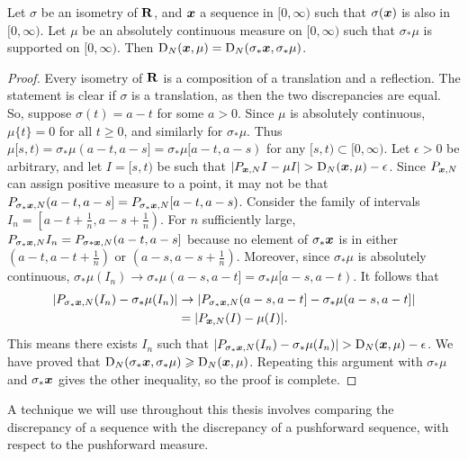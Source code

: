 \begin{lemma}\label{lem:flip-discrepancy}
Let $\sigma$ be an isometry of $\mathbf{R}$, and ${\boldsymbol x}$ a sequence in $[0,\infty)$ 
such that $\sigma({\boldsymbol x})$ is also in $[0,\infty)$. Let $\mu$ be an absolutely 
continuous measure on $[0,\infty)$ such that $\sigma_\ast \mu$ is supported on 
$[0,\infty)$. Then $\operatorname{D}_N({\boldsymbol x}, \mu) = \operatorname{D}_N(\sigma_\ast {\boldsymbol x}, \sigma_\ast \mu)$. 
\end{lemma}
\begin{proof}
Every isometry of $\mathbf{R}$ is a composition of a translation and a reflection. 
The statement is clear if $\sigma$ is a translation, as then the two 
discrepancies are equal. So, suppose $\sigma(t) = a - t$ for some $a>0$. Since 
$\mu$ is absolutely continuous, $\mu\{t\}=0$ for all $t\geqslant 0$, and 
similarly for $\sigma_\ast\mu$. Thus 
$\mu[s,t) = \sigma_\ast\mu(a-t,a-s] = \sigma_\ast\mu[a-t,a-s)$ for any 
$[s,t)\subset [0,\infty)$. Let $\epsilon>0$ be arbitrary, and let 
$I = [s,t)$ be such that $|P_{{\boldsymbol x},N}I - \mu I| > \operatorname{D}_N({\boldsymbol x},\mu) - \epsilon$. 
Since $P_{{\boldsymbol x},N}$ can assign positive measure to a point, it may not be that 
$P_{\sigma_\ast {\boldsymbol x},N}(a-t,a-s] = P_{\sigma_\ast {\boldsymbol x},N}[a-t,a-s)$. Consider the 
family of intervals $I_n = \left[a-t+\frac 1 n, a-s+\frac 1 n\right)$. For 
$n$ sufficiently large, 
$P_{\sigma_\ast{\boldsymbol x},N}I_n = P_{\sigma\ast{\boldsymbol x},N}(a-t,a-s]$ because no element of 
$\sigma_\ast{\boldsymbol x}$ is in either $\left(a-t,a-t+\frac 1 n\right)$ or 
$\left(a-s,a-s+\frac 1 n\right)$. Moreover, since $\sigma_\ast\mu$ is absolutely 
continuous, 
$\sigma_\ast\mu(I_n) \to \sigma_\ast\mu(a-s,a-t] = \sigma_\ast\mu[a-s,a-t)$. 
It follows that 
\begin{align*}
	|P_{\sigma_\ast{\boldsymbol x},N}(I_n) - \sigma_\ast\mu(I_n)| 
		&\to |P_{\sigma_\ast{\boldsymbol x},N}(a-s,a-t] - \sigma_\ast\mu(a-s,a-t]| \\
		&= |P_{{\boldsymbol x},N}(I) - \mu(I)| .
\end{align*}
This means there exists $I_n$ such that 
$|P_{\sigma_\ast\bx,N}(I_n) - \sigma_\ast\mu(I_n)|> \D_N(\bx,\mu) - \epsilon$. 
We have proved that 
$\operatorname{D}_N(\sigma_\ast{\boldsymbol x},\sigma_\ast\mu) \geqslant \operatorname{D}_N({\boldsymbol x},\mu)$. Repeating this 
argument with $\sigma_\ast\mu$ and $\sigma_\ast{\boldsymbol x}$ gives the other inequality, 
so the proof is complete. 
\end{proof}

A technique we will use throughout this thesis involves comparing the 
discrepancy of a sequence with the discrepancy of a pushforward sequence, 
with respect to the pushforward measure. 


